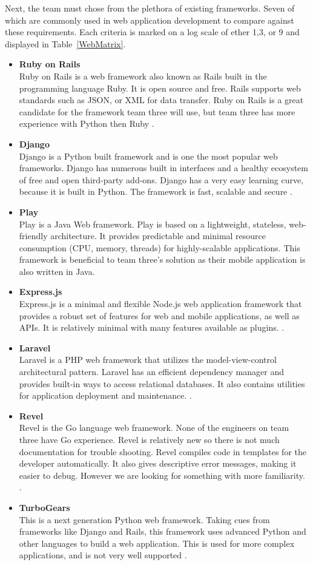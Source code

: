 \documentclass[Letter,11pt]{article}
\begin{document}
		Next, the team must chose from the plethora of existing frameworks. Seven of which are commonly used in web application development to compare against these requirements. Each criteria is marked on a log scale of ether 1,3, or 9 and displayed in Table~\ref{WebMatrix}.
		\begin{itemize}
			\item \textbf{Ruby on Rails} \\
			Ruby on Rails is a web framework also known as Rails built in the programming language Ruby. It is open source and free. Rails supports web standards such as JSON, or XML for data transfer. Ruby on Rails is a great candidate for the framework team three will use, but team three has more experience with Python then Ruby \cite{rubyonrails}.  
			\item \textbf{Django} \\
			Django is a Python built framework and is one the most popular web frameworks. Django has numerous built in interfaces and a healthy ecosystem of free and open third-party add-ons. Django has a very easy learning curve, because it is built in Python. The framework is fast, scalable and secure \cite{django}.
			\item \textbf{Play} \\
			Play is a Java Web framework. Play is based on a lightweight, stateless, web-friendly architecture. It provides predictable and minimal resource consumption (CPU, memory, threads) for highly-scalable applications. This framework is beneficial to team three's solution as their mobile application is also written in Java\cite{play}.
			\item  \textbf{Express.js}\\
			Express.js is a minimal and flexible Node.js web application framework that provides a robust set of features for web and mobile applications, as well as APIs. It is relatively minimal with many features available as plugins. \cite{express}.
			\item \textbf{Laravel} \\
			Laravel is a PHP web framework that utilizes the model-view-control architectural pattern.  Laravel has an efficient dependency manager and provides built-in ways to access relational databases.  It also contains utilities for application deployment and maintenance. \cite{laravel}. 
			\item \textbf{Revel} \\
			Revel is the Go language web framework. None of the engineers on team three have Go experience. Revel is relatively new so there is not much documentation for trouble shooting. Revel compiles code in templates for the developer automatically. It also gives descriptive error messages, making it easier to debug. However we are looking for something with more familiarity. \cite{revel}.
			\item \textbf{TurboGears}\\
			This is a next generation Python web framework. Taking cues from frameworks like Django and Rails, this framework uses advanced Python and other languages to build a web application. This is used for more complex applications, and is not very well supported \cite{turbogears}.
		\end{itemize}
		
\end{document}
